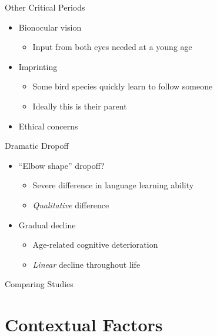 \documentclass{beamer}
\begin{document}
\begin{frame}{Other Critical Periods}
  \begin{itemize}
    \item Bionocular vision
    \begin{itemize}
      \item Input from both eyes needed at a young age
    \end{itemize}
    \item Imprinting
    \begin{itemize}
      \item Some bird species quickly learn to follow someone
      \item Ideally this is their parent
    \end{itemize}
    \item Ethical concerns
  \end{itemize}
\end{frame}

\begin{frame}{Dramatic Dropoff}
  \begin{itemize}
    \item ``Elbow shape'' dropoff?
    \begin{itemize}
      \item Severe difference in language learning ability
      \item \emph{Qualitative} difference
    \end{itemize}
    \item Gradual decline
    \begin{itemize}
      \item Age-related cognitive deterioration
      \item \emph{Linear} decline throughout life
    \end{itemize}
  \end{itemize}
\end{frame}

\begin{frame}{Comparing Studies} %
\end{frame}

\section{Contextual Factors}
\end{document}
